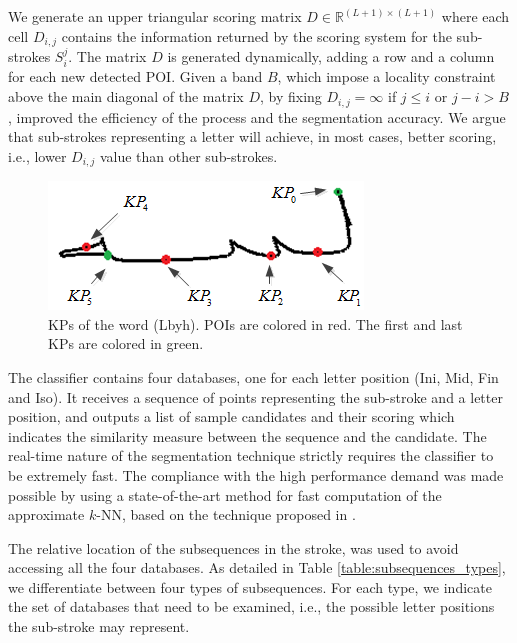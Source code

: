 \documentclass[10pt, conference, compsocconf]{IEEEtran}
\begin{document}
We generate an upper triangular scoring matrix $D\in\mathbb{R}^{(L+1)\times (L+1)}$ where each cell $D_{i,j}$ contains the information returned by the scoring system for the sub-strokes $S_i^j$. 
The matrix $D$ is generated dynamically, adding a row and a column for each new detected POI.
Given a band $B$, which impose a locality constraint above the main diagonal of the matrix $D$, by fixing $D_{i,j}=\infty$ if  $j \leq i$ or $j-i>B$, improved the efficiency of the process and the segmentation accuracy. 
We argue that sub-strokes representing a letter will achieve, in most cases, better scoring, i.e., lower $D_{i,j}$ value than other sub-strokes.
\begin{figure}
\centering
\includegraphics[width=0.6\columnwidth]{./figures/candidate_points}
\caption{KPs of the word  (Lbyh). POIs are colored in red. The first and last KPs are colored in green.}
\label{fig:candidate_points}
\end{figure}

The classifier contains four databases, one for each letter position (Ini, Mid, Fin and Iso). 
It receives a sequence of points representing the sub-stroke and a letter position, and outputs a list of sample candidates and their scoring which indicates the similarity measure between the sequence and the candidate.
The real-time nature of the segmentation technique strictly requires the classifier to be extremely fast.
The compliance with the high performance demand was made possible by using a state-of-the-art method for fast computation of the approximate $k$-NN, based on the technique proposed in \cite{saabni2013efficient}.

The relative location of the subsequences in the stroke, was used to avoid accessing all the four databases. 
As detailed in Table \ref{table:subsequences_types}, we differentiate between four types of subsequences. 
For each type, we indicate the set of databases that need to be examined, i.e., the possible letter positions the sub-stroke may represent. 
\end{document}
